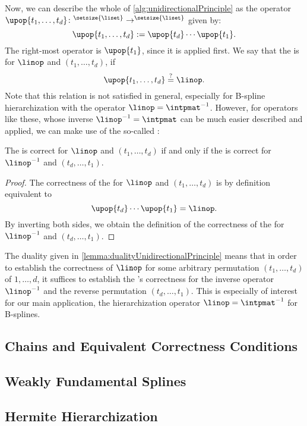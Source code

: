 Now, we can describe the whole \up of
\cref{alg:unidirectionalPrinciple} as the operator
$\upop{t_1,\dotsc,t_d}\colon \real^{\setsize{\liset}} \to
\real^{\setsize{\liset}}$ given by:
\begin{equation}
  \upop{t_1,\dotsc,t_d}
  := \upop{t_d} \dotsm \upop{t_1}.
\end{equation}
The right-most operator is $\upop{t_1}$, since it is applied first.
We say that the \up is  for $\linop$ and
$(t_1, \dotsc, t_d)$, if
\begin{equation}
  \upop{t_1,\dotsc,t_d}
  \overset{?}{=} \linop.
\end{equation}
Note that this relation is not satisfied in general,
especially for B-spline hierarchization with the operator
$\linop = \intpmatinv$.
However, for operators like these, whose inverse
$\linopinv = \intpmat$ can be much easier described and applied,
we can make use of the so-called :

\begin{lemma}
  \label{lemma:dualityUnidirectionalPrinciple}
  The \up is correct for $\linop$ and $(t_1, \dotsc, t_d)$
  if and only if the \up is correct for $\linopinv$ and $(t_d, \dotsc, t_1)$.
\end{lemma}

\begin{proof}
  The correctness of the \up for $\linop$ and $(t_1, \dotsc, t_d)$
  is by definition equivalent to
  \begin{equation}
    \upop{t_d} \dotsm \upop{t_1} = \linop.
  \end{equation}
  By inverting both sides, we obtain the definition of the
  correctness of the \up for $\linopinv$ and $(t_d, \dotsc, t_1)$.
\end{proof}

The duality given in \cref{lemma:dualityUnidirectionalPrinciple}
means that in order to establish the correctness of $\linop$
for some arbitrary permutation $(t_1, \dotsc, t_d)$ of $1, \dotsc, d$,
it suffices to establish the \up's correctness for the
inverse operator $\linopinv$ and the reverse permutation $(t_d, \dotsc, t_1)$.
This is especially of interest for our main application,
the hierarchization operator $\linop = \intpmatinv$ for B-splines.



\subsection{Chains and Equivalent Correctness Conditions}
\label{sec:453chains}

\blindtext{}



\subsection{Weakly Fundamental Splines}
\label{sec:454wfs}

\blindtext{}



\subsection{Hermite Hierarchization}
\label{sec:455hermiteHierarchization}

\blindtext{}
